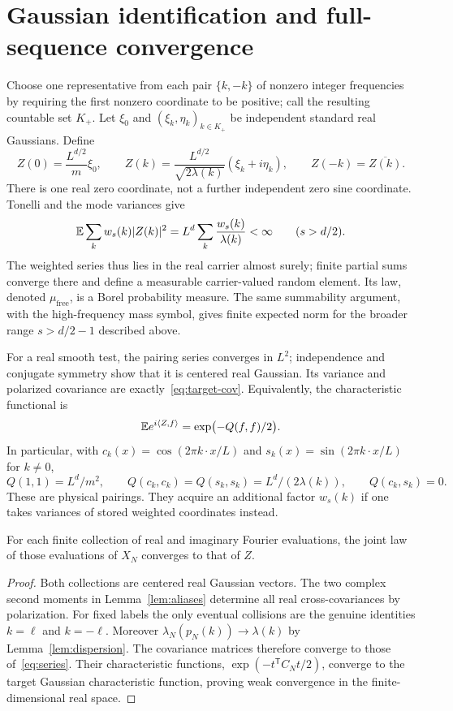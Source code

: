 \section{Gaussian identification and full-sequence convergence}\label{sec:identify}
Choose one representative from each pair $\{k,-k\}$ of nonzero integer
frequencies by requiring the first nonzero coordinate to be positive; call
the resulting countable set $K_+$. Let $\xi_0$ and
$(\xi_k,\eta_k)_{k\in K_+}$ be independent standard real Gaussians. Define
\begin{equation}\label{eq:series}
 Z(0)=\frac{L^{d/2}}{m}\xi_0,\qquad
 Z(k)=\frac{L^{d/2}}{\sqrt{2\lambda(k)}}(\xi_k+i\eta_k),\qquad
 Z(-k)=\overline{Z(k)}.
\end{equation}
There is one real zero coordinate, not a further independent zero sine
coordinate. Tonelli and the mode variances give
\[
 \mathbb E\sum_kw_s(k)\lvert Z(k)\rvert^2
 =L^d\sum_k\frac{w_s(k)}{\lambda(k)}<\infty\qquad(s>d/2).
\]
The weighted series thus lies in the real carrier almost surely; finite
partial sums converge there and define a measurable carrier-valued random
element. Its law, denoted $\mu_{\mathrm{free}}$, is a Borel probability measure.
The same summability argument, with the high-frequency mass symbol, gives
finite expected norm for the broader range $s>d/2-1$ described above.

For a real smooth test, the pairing series converges in $L^2$; independence
and conjugate symmetry show that it is centered real Gaussian. Its variance
and polarized covariance are exactly~\eqref{eq:target-cov}. Equivalently, the
characteristic functional is
\[
 \mathbb E e^{i\langle Z,f\rangle}=\exp\bigl(-Q(f,f)/2\bigr).
\]
In particular, with $c_k(x)=\cos(2\pi k\cdot x/L)$ and
$s_k(x)=\sin(2\pi k\cdot x/L)$ for $k\ne0$,
\[
 Q(1,1)=L^d/m^2,\qquad
 Q(c_k,c_k)=Q(s_k,s_k)=L^d/(2\lambda(k)),\qquad Q(c_k,s_k)=0.
\]
These are physical pairings. They acquire an additional factor $w_s(k)$ if
one takes variances of stored weighted coordinates instead.

\begin{lemma}\label{lem:finite}
For each finite collection of real and imaginary Fourier evaluations, the
joint law of those evaluations of $X_N$ converges to that of $Z$.
\end{lemma}
\begin{proof}
Both collections are centered real Gaussian vectors. The two complex second
moments in Lemma~\ref{lem:aliases} determine all real cross-covariances by
polarization. For fixed labels the only eventual collisions are the genuine
identities $k=\ell$ and $k=-\ell$. Moreover
$\lambda_N(p_N(k))\to\lambda(k)$ by Lemma~\ref{lem:dispersion}.
The covariance matrices therefore converge to those of~\eqref{eq:series}.
Their characteristic functions, $\exp(-t^\mathsf{T}C_Nt/2)$, converge to the
target Gaussian characteristic function, proving weak convergence in the
finite-dimensional real space.
\end{proof}

